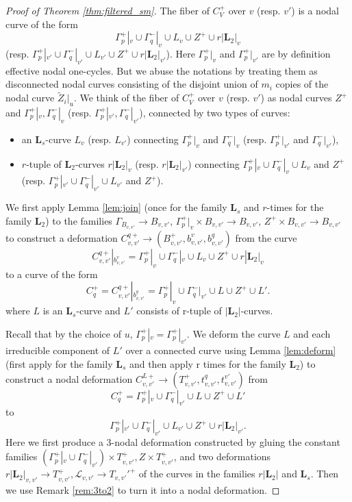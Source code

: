 \documentclass{amsart}
\theoremstyle{definition}
\theoremstyle{remark}
\begin{document}
\begin{proof}[Proof of Theorem \ref{thm:filtered_sm}]
    The fiber of $C_V^+$ over $v$  (resp. $v'$) is a nodal curve of the form 
     \[
     {\Gamma}_p^+|_{v}\cup \Gamma_q^-|_v \cup L_{v} \cup Z^+ \cup r|\mathbf{L}_2|_{v}
     \]
     (resp.
     ${\Gamma}_p^+|_{v'}\cup \Gamma_q^-|_{v'} \cup L_{v'} \cup Z^+ \cup r|\mathbf{L}_2|_{v'}$).  
     Here ${\Gamma}_p^+|_{v}$ and ${\Gamma}_p^+|_{v'}$ are by definition effective nodal one-cycles. 
     But we abuse the notations by treating them as disconnected nodal curves consisting of the disjoint union of $m_i$ copies of the nodal curve $\tilde{Z}_i|_{u}$.
     We think of the fiber of $C_V^+$ over $v$  (resp. $v'$) as nodal curves $Z^+$ and ${\Gamma}_{p}^+|_{v}, \Gamma_q^-|_{v}$ (resp. ${\Gamma}_{p}^+|_{v'}, \Gamma_q^-|_{v'}$),  connected by two types of curves: 
     \begin{itemize}
         \item an $\mathbf{L}_{s}$-curve $L_v$ (resp. $L_{v'}$) connecting ${\Gamma}_{p}^+|_{v}$ and $\Gamma_q^-|_{v}$ (resp. ${\Gamma}_{p}^+|_{v'}$ and $\Gamma_q^-|_{v'}$),
         \item $r$-tuple of $\mathbf{L}_2$-curves $r|\mathbf{L}_2|_{v}$ (resp. $r|\mathbf{L}_2|_{v'}$) connecting ${\Gamma}_p^+|_{v}\cup \Gamma_q^-|_v \cup L_{v}$ and $Z^+$
     (resp.
     ${\Gamma}_p^+|_{v'}\cup \Gamma_q^-|_{v'} \cup L_{v'}$ and $Z^+$).
     \end{itemize}  
     We first apply Lemma \ref{lem:join} (once for the family $\mathbf{L}_s$ and $r$-times for the family $\mathbf{L}_2$) to the families $\Gamma_{B_{v, v'}}\to B_{v, v'}$, $\Gamma_p^+|_v \times B_{v, v'} \to B_{v, v'}$, $Z^+ \times B_{v, v'} \to B_{v, v'}$ to construct a deformation $C^{q+}_{v, v'} \to (B^+_{v, v'}, b_{v, v'}^v, b_{v, v'}^q)$ from the curve
     \[
     C^{q+}_{v, v'}|_{b_{v, v'}^v}={\Gamma}_p^+|_{v}\cup \Gamma_q^-|_v \cup L_{v} \cup Z^+ \cup r|\mathbf{L}_2|_{v}
     \]
     to a curve of the form
     \[
     C_q^+=C^{q+}_{v, v'}|_{b_{v, v'}^q}={\Gamma}_p^+|_{v}\cup \Gamma_q^-|_{v'} \cup L \cup Z^+ \cup L'.
     \]
     where $L$ is an $\mathbf{L}_s$-curve and  $L'$ consists of r-tuple of $|\mathbf{L}_2|$-curves.

     Recall that by the choice of $u$, $\Gamma_p^+|_v=\Gamma_p^+|_{v'}$.
     We deform the curve $L$ and each irreducible component of $L'$ over a connected curve using Lemma \ref{lem:deform} (first apply for the family $\mathbf{L}_s$ and then apply r times for the family $\mathbf{L}_2$) to construct a nodal deformation $C^{L+}_{v, v'} \to (T^+_{v, v'}, t_{v, v'}^q, t_{v, v'}^{v'})$ from  
     \[
     C_q^+={\Gamma}_p^+|_{v}\cup \Gamma_q^-|_{v'} \cup L \cup Z^+ \cup L'
     \]
     to
     \[
     {\Gamma}_p^+|_{v'}\cup \Gamma_q^-|_{v'} \cup L_{v'} \cup Z^+ \cup r|\mathbf{L}_2|_{v'}.
     \]
     Here we first produce a $3$-nodal deformation
     constructed by gluing the constant families $({\Gamma}_p^+|_{v}\cup \Gamma_q^-|_{v'})\times T_{v, v'}^+, Z\times T_{v, v'}^+$, and two deformations $r|\mathbf{L}_2|_{v, v'} \to T_{v, v'}^+, \mathcal{L}_{v, v'} \to T_{v, v'}'^+$ of the curves in the families $r|\mathbf{L}_2|$ and $\mathbf{L}_{s}$.
     Then we use Remark \ref{rem:3to2} to turn it into a nodal deformation.
     

\end{proof}
\end{document}
